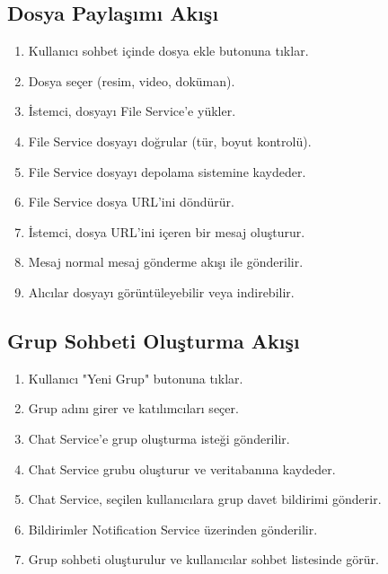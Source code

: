 \subsection{Dosya Paylaşımı Akışı}
\begin{enumerate}
    \item Kullanıcı sohbet içinde dosya ekle butonuna tıklar.
    \item Dosya seçer (resim, video, doküman).
    \item İstemci, dosyayı File Service'e yükler.
    \item File Service dosyayı doğrular (tür, boyut kontrolü).
    \item File Service dosyayı depolama sistemine kaydeder.
    \item File Service dosya URL'ini döndürür.
    \item İstemci, dosya URL'ini içeren bir mesaj oluşturur.
    \item Mesaj normal mesaj gönderme akışı ile gönderilir.
    \item Alıcılar dosyayı görüntüleyebilir veya indirebilir.
\end{enumerate}

\subsection{Grup Sohbeti Oluşturma Akışı}
\begin{enumerate}
    \item Kullanıcı "Yeni Grup" butonuna tıklar.
    \item Grup adını girer ve katılımcıları seçer.
    \item Chat Service'e grup oluşturma isteği gönderilir.
    \item Chat Service grubu oluşturur ve veritabanına kaydeder.
    \item Chat Service, seçilen kullanıcılara grup davet bildirimi gönderir.
    \item Bildirimler Notification Service üzerinden gönderilir.
    \item Grup sohbeti oluşturulur ve kullanıcılar sohbet listesinde görür.
\end{enumerate}

